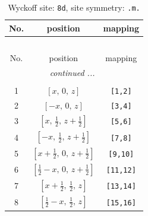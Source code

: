 \documentclass[fleqn,8pt]{jsarticle}
\begin{document}
\begin{longtable}{ccc}
\caption{Wyckoff site: {\tt 8d}, site symmetry: {\tt .m.}}
 \\
 \hline \hline
No. & position & mapping \\ \hline \endfirsthead

\multicolumn{2}{l}{\tablename\ \thetable{}} \\
 \hline \hline
No. & position & mapping \\ \hline \endhead

 \hline \hline
\multicolumn{2}{r}{\footnotesize\it continued ...} \\ \endfoot

 \hline \hline
\multicolumn{2}{r}{} \\ \endlastfoot

1 & $\left[ x,\, 0,\, z \right]$ & {\tt [1,2]} \\ \hline
2 & $\left[ - x,\, 0,\, z \right]$ & {\tt [3,4]} \\ \hline
3 & $\left[ x,\, \frac{1}{2},\, z + \frac{1}{2} \right]$ & {\tt [5,6]} \\ \hline
4 & $\left[ - x,\, \frac{1}{2},\, z + \frac{1}{2} \right]$ & {\tt [7,8]} \\ \hline
5 & $\left[ x + \frac{1}{2},\, 0,\, z + \frac{1}{2} \right]$ & {\tt [9,10]} \\ \hline
6 & $\left[ \frac{1}{2} - x,\, 0,\, z + \frac{1}{2} \right]$ & {\tt [11,12]} \\ \hline
7 & $\left[ x + \frac{1}{2},\, \frac{1}{2},\, z \right]$ & {\tt [13,14]} \\ \hline
8 & $\left[ \frac{1}{2} - x,\, \frac{1}{2},\, z \right]$ & {\tt [15,16]} \\
\end{longtable}
\renewcommand{\arraystretch}{1.2}
\end{document}
